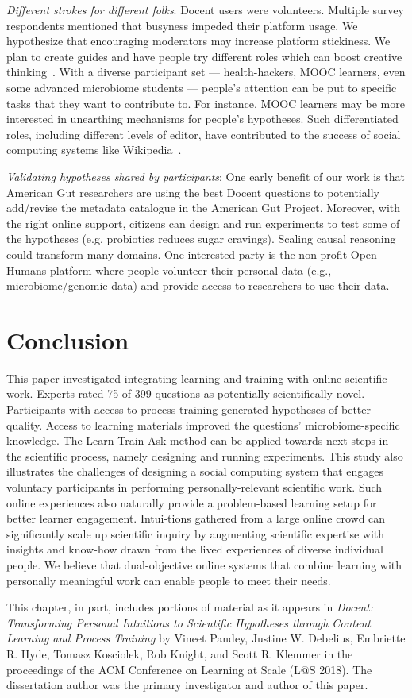 \textit{Different strokes for different folks}: Docent users were volunteers. Multiple survey respondents mentioned that busyness impeded their platform usage. We hypothesize that encouraging moderators may increase platform stickiness. We plan to create guides and have people try different roles which can boost creative thinking~\cite{Teevan:2017:BWC:3059454.3059467}. With a diverse participant set — health-hackers, MOOC learners, even some advanced microbiome students — people’s attention can be put to specific tasks that they want to contribute to. For instance, MOOC learners may be more interested in unearthing mechanisms for people’s hypotheses. Such differentiated roles, including different levels of editor, have contributed to the success of social computing systems like Wikipedia~\cite{Krieger2009}.

\textit{Validating hypotheses shared by participants}: One early benefit of our work is that American Gut researchers are using the best Docent questions to potentially add/revise the metadata catalogue in the American Gut Project. Moreover, with the right online support, citizens can design and run experiments to test some of the hypotheses (e.g. probiotics reduces sugar cravings). Scaling causal reasoning could transform many domains. One interested party is the non-profit Open Humans platform where people volunteer their personal data (e.g., microbiome/genomic data) and provide access to researchers to use their data.

\section{Conclusion}
This paper investigated integrating learning and training with online scientific work. Experts rated 75 of 399 questions as potentially scientifically novel. Participants with access to process training generated hypotheses of better quality. Access to learning materials improved the questions’ microbiome-specific knowledge.  The Learn-Train-Ask method can be applied towards next steps in the scientific process, namely designing and running experiments. This study also illustrates the challenges of designing a social computing system that engages voluntary participants in performing personally-relevant scientific work. Such online experiences also naturally provide a problem-based learning setup for better learner engagement. Intui-tions gathered from a large online crowd can significantly scale up scientific inquiry by augmenting scientific expertise with insights and know-how drawn from the lived experiences of diverse individual people. We believe that dual-objective online systems that combine learning with personally meaningful work can enable people to meet their needs.

This chapter, in part, includes portions of material as it appears in \emph{Docent: Transforming Personal Intuitions to Scientific Hypotheses through Content Learning and Process Training} by Vineet Pandey, Justine W. Debelius, Embriette R. Hyde, Tomasz Kosciolek, Rob Knight, and Scott R. Klemmer in the proceedings of the ACM Conference on Learning at Scale (L@S 2018). The dissertation author was the primary investigator and author of this paper.


